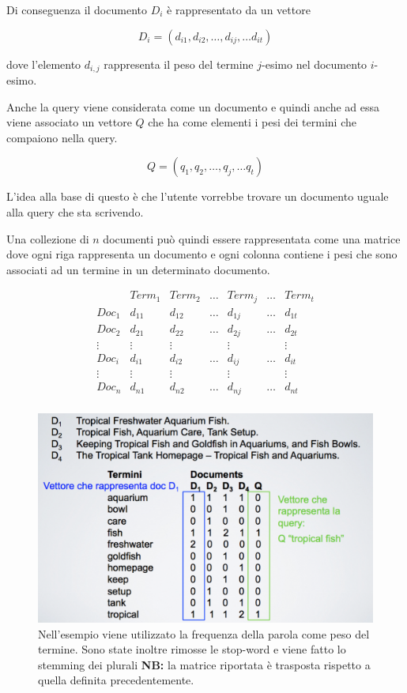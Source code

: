 Di conseguenza il documento $D_i$ è rappresentato da un vettore

$$
D_i = (d_{i1},d_{i2},\ldots,d_{ij}, \ldots d_{it})
$$

\noindent dove l'elemento $d_{i,j}$ rappresenta il peso del termine $j$-esimo nel documento $i$-esimo.

Anche la query viene considerata come un documento e quindi anche ad essa viene associato un vettore $Q$ che ha come elementi i pesi dei termini che compaiono nella query.

$$
Q = (q_{1},q_{2},\ldots,q_{j}, \ldots q_{t})
$$

L'idea alla base di questo è che l'utente vorrebbe trovare un documento uguale alla query che sta scrivendo.

Una collezione di $n$ documenti può quindi essere rappresentata come una matrice dove ogni riga rappresenta un documento e ogni colonna contiene i pesi che sono associati ad un termine in un determinato documento.

$$
\begin{matrix}
& Term_1 & Term_2 & \ldots & Term_j & \ldots &Term_t \\ 
Doc_1 & d_{11} & d_{12}& \ldots & d_{1j} & \ldots & d_{1t} \\ 
Doc_2 & d_{21} & d_{22}& \ldots & d_{2j} & \ldots & d_{2t} \\ 
\vdots & \vdots &\vdots  &  & \vdots && \vdots\\ 
Doc_i & d_{i1} & d_{i2}& \ldots & d_{ij} & \ldots & d_{it} \\ 
\vdots & \vdots &\vdots  &  & \vdots && \vdots\\ 
Doc_n & d_{n1} & d_{n2}& \ldots & d_{nj} & \ldots & d_{nt} \\ 
\end{matrix}
$$

\begin{figure}[htbp]
	\centering
	\includegraphics[width=0.6\linewidth]{images/l8-mod-vet}
	\caption{Nell'esempio viene utilizzato la frequenza della parola come peso del termine. Sono state inoltre rimosse le stop-word e viene fatto lo stemming dei plurali \textbf{NB:} la matrice riportata è trasposta rispetto a quella definita precedentemente.}
\end{figure}

